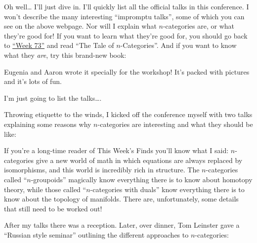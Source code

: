 \documentclass{article}
\def\tightlist{}
\renewcommand{\texttt}[1]{%
  \begingroup
  \ttfamily
  \begingroup\lccode`~=`/\lowercase{\endgroup\def~}{/\discretionary{}{}{}}%
  \begingroup\lccode`~=`[\lowercase{\endgroup\def~}{[\discretionary{}{}{}}%
  \begingroup\lccode`~=`.\lowercase{\endgroup\def~}{.\discretionary{}{}{}}%
  \catcode`/=\active\catcode`[=\active\catcode`.=\active
  \scantokens{#1\noexpand}%
  \endgroup
}
\begin{document}
Oh well\ldots{} I'll just dive in. I'll quickly list all the official
talks in this conference. I won't describe the many interesting
``impromptu talks'', some of which you can see on the above webpage. Nor
will I explain what \(n\)-categories are, or what they're good for! If
you want to learn what they're good for, you should go back to
\protect\hyperlink{week73}{``Week 73''} and read ``The Tale of
\(n\)-Categories''. And if you want to know what they \emph{are}, try
this brand-new book:


Eugenia and Aaron wrote it specially for the workshop! It's packed with
pictures and it's lots of fun.

I'm just going to list the talks\ldots.

Throwing etiquette to the winds, I kicked off the conference myself with
two talks explaining some reasons why \(n\)-categories are interesting
and what they should be like:


If you're a long-time reader of This Week's Finds you'll know what I
said: \(n\)-categories give a new world of math in which equations are
always replaced by isomorphisms, and this world is incredibly rich in
structure. The \(n\)-categories called ``\(n\)-groupoids'' magically
know everything there is to know about homotopy theory, while those
called ``\(n\)-categories with duals'' know everything there is to know
about the topology of manifolds. There are, unfortunately, some details
that still need to be worked out!

After my talks there was a reception. Later, over dinner, Tom Leinster
gave a ``Russian style seminar'' outlining the different approaches to
\(n\)-categories:
\end{document}
